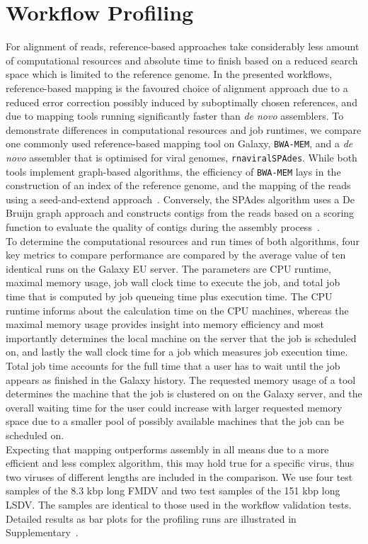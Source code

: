\section{Workflow Profiling}
For alignment of reads, reference-based approaches take considerably less amount of computational resources and absolute time to finish based on a reduced search space which is limited to the reference genome. In the presented workflows, reference-based mapping is the favoured choice of alignment approach due to a reduced error correction possibly induced by suboptimally chosen references, and due to mapping tools running significantly faster than \textit{de novo} assemblers. To demonstrate differences in computational resources and job runtimes, we compare one commonly used reference-based mapping tool on Galaxy, \texttt{BWA-MEM}, and a \textit{de novo} assembler that is optimised for viral genomes, \texttt{rnaviralSPAdes}. While both tools implement graph-based algorithms, the efficiency of \texttt{BWA-MEM} lays in the construction of an index of the reference genome, and the mapping of the reads using a seed-and-extend approach~\cite{li2013aligning}. Conversely, the SPAdes algorithm uses a De Bruijn graph approach and constructs contigs from the reads based on a scoring function to evaluate the quality of contigs during the assembly process~\cite{bankevich2012spades}.\\
To determine the computational resources and run times of both algorithms, four key metrics to compare performance are compared by the average value of ten identical runs on the Galaxy EU server. The parameters are CPU runtime, maximal memory usage, job wall clock time to execute the job, and total job time that is computed by job queueing time plus execution time. The CPU runtime informs about the calculation time on the CPU machines, whereas the maximal memory usage provides insight into memory efficiency and most importantly determines the local machine on the server that the job is scheduled on, and lastly the wall clock time for a job which measures job execution time. Total job time accounts for the full time that a user has to wait until the job appears as finished in the Galaxy history. The requested memory usage of a tool determines the machine that the job is clustered on on the Galaxy server, and the overall waiting time for the user could increase with larger requested memory space due to a smaller pool of possibly available machines that the job can be scheduled on.\\
Expecting that mapping outperforms assembly in all means due to a more efficient and less complex algorithm, this may hold true for a specific virus, thus two viruses of different lengths are included in the comparison. We use four test samples of the 8.3 kbp long \ac{FMDV} and two test samples of the 151 kbp long \ac{LSDV}. The samples are identical to those used in the workflow validation tests. Detailed results as bar plots for the profiling runs are illustrated in Supplementary~. \\

